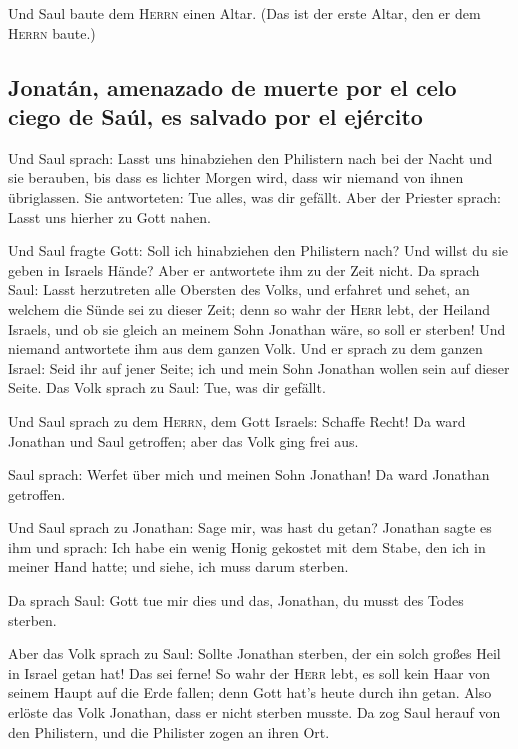  Und Saul baute dem \textsc{Herrn} einen Altar. (Das ist
der erste Altar, den er dem \textsc{Herrn} baute.)

\hypertarget{jonatuxe1n-amenazado-de-muerte-por-el-celo-ciego-de-sauxfal-es-salvado-por-el-ejuxe9rcito}{%
\subsection{Jonatán, amenazado de muerte por el celo ciego de Saúl, es
salvado por el
ejército}\label{jonatuxe1n-amenazado-de-muerte-por-el-celo-ciego-de-sauxfal-es-salvado-por-el-ejuxe9rcito}}

 Und Saul sprach: Lasst uns hinabziehen den Philistern
nach bei der Nacht und sie berauben, bis dass es lichter Morgen wird,
dass wir niemand von ihnen übriglassen. Sie antworteten: Tue alles, was
dir gefällt. Aber der Priester sprach: Lasst uns hierher zu Gott nahen.

 Und Saul fragte Gott: Soll ich hinabziehen den
Philistern nach? Und willst du sie geben in Israels Hände? Aber er
antwortete ihm zu der Zeit nicht.  Da sprach Saul: Lasst
herzutreten alle Obersten des Volks, und erfahret und sehet, an welchem
die Sünde sei zu dieser Zeit;  denn so wahr der
\textsc{Herr} lebt, der Heiland Israels, und ob sie gleich an meinem
Sohn Jonathan wäre, so soll er sterben! Und niemand antwortete ihm aus
dem ganzen Volk.  Und er sprach zu dem ganzen Israel:
Seid ihr auf jener Seite; ich und mein Sohn Jonathan wollen sein auf
dieser Seite. Das Volk sprach zu Saul: Tue, was dir gefällt.

 Und Saul sprach zu dem \textsc{Herrn}, dem Gott Israels:
Schaffe Recht! Da ward Jonathan und Saul getroffen; aber das Volk ging
frei aus.

 Saul sprach: Werfet über mich und meinen Sohn Jonathan!
Da ward Jonathan getroffen.

 Und Saul sprach zu Jonathan: Sage mir, was hast du
getan? Jonathan sagte es ihm und sprach: Ich habe ein wenig Honig
gekostet mit dem Stabe, den ich in meiner Hand hatte; und siehe, ich
muss darum sterben.

 Da sprach Saul: Gott tue mir dies und das, Jonathan, du
musst des Todes sterben.

 Aber das Volk sprach zu Saul: Sollte Jonathan sterben,
der ein solch großes Heil in Israel getan hat! Das sei ferne! So wahr
der \textsc{Herr} lebt, es soll kein Haar von seinem Haupt auf die Erde
fallen; denn Gott hat's heute durch ihn getan. Also erlöste das Volk
Jonathan, dass er nicht sterben musste.  Da zog Saul
herauf von den Philistern, und die Philister zogen an ihren Ort.


